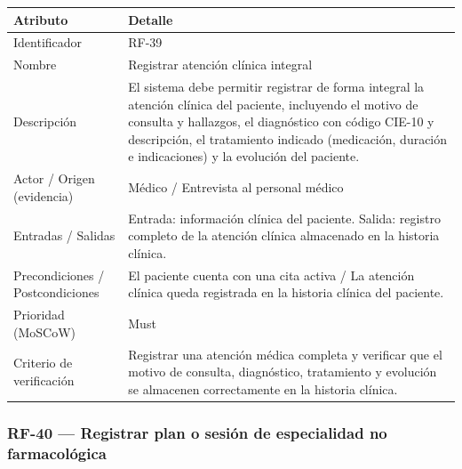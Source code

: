 \documentclass[11pt,a4paper]{article}
\begin{document}
	\begin{longtable}{p{} p{}}
		
		\toprule
		\textbf{Atributo} & \textbf{Detalle} \\
		\midrule
		\endhead
		
		Identificador & RF-39 \\
		Nombre & Registrar atención clínica integral \\
		Descripción & El sistema debe permitir registrar de forma integral la atención clínica del paciente, incluyendo el motivo de consulta y hallazgos, el diagnóstico con código CIE-10 y descripción, el tratamiento indicado (medicación, duración e indicaciones) y la evolución del paciente. \\
		Actor / Origen (evidencia) & Médico / Entrevista al personal médico \\
		Entradas / Salidas & Entrada: información clínica del paciente. Salida: registro completo de la atención clínica almacenado en la historia clínica. \\
		Precondiciones / Postcondiciones & El paciente cuenta con una cita activa / La atención clínica queda registrada en la historia clínica del paciente. \\
		Prioridad (MoSCoW) & Must \\
		Criterio de verificación & Registrar una atención médica completa y verificar que el motivo de consulta, diagnóstico, tratamiento y evolución se almacenen correctamente en la historia clínica. \\
		
		\bottomrule
		
	\end{longtable}
	
	\subsubsection{RF-40 --- Registrar plan o sesión de especialidad no farmacológica}
	
\end{document}
